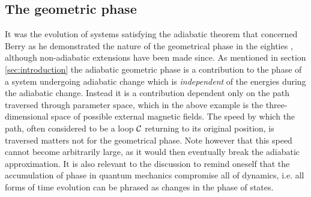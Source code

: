 \documentclass[main.tex]{subfiles}
\begin{document}
\subsection{The geometric phase}\label{sec:geophase}
It was the evolution of systems satisfying the adiabatic theorem that concerned Berry as he
demonstrated the nature of the geometrical phase in the eighties \cite{berry1984}, although non-adiabatic
extensions have been made since\cite{aharonovanandan}. As mentioned in section
\ref{sec:introduction} the adiabatic geometric phase is a contribution to the phase of a
system undergoing adiabatic change which is \textit{independent} of the energies during the
adiabatic change\cite{erikrev}. %
Instead it is a contribution dependent only on the path traversed through parameter space,
which in the above example is the three-dimensional space of possible external magnetic
fields. The speed by which the path, often considered to be a loop \(\mathbb{\cal C}\)
returning to its original position, is traversed matters not for the geometrical phase.
Note however that this speed cannot become arbitrarily large, as it would then eventually
break the adiabatic approximation. It is also relevant to the discussion to remind oneself
that the accumulation of phase in quantum mechanics compromise all of dynamics, i.e. all forms
of time evolution can be phrased as changes in the phase of states.
\end{document}
